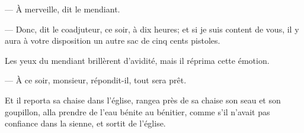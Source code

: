 — À merveille, dit le mendiant.

— Donc, dit le coadjuteur, ce soir, à dix heures; et si je suis content de vous, il y aura à votre disposition un autre sac de cinq cents pistoles.

Les yeux du mendiant brillèrent d'avidité, mais il réprima cette émotion.

— À ce soir, monsieur, répondit-il, tout sera prêt.

Et il reporta sa chaise dans l'église, rangea près de sa chaise son seau et son goupillon, alla prendre de l'eau bénite au bénitier, comme s'il n'avait pas confiance dans la sienne, et sortit de l'église.
